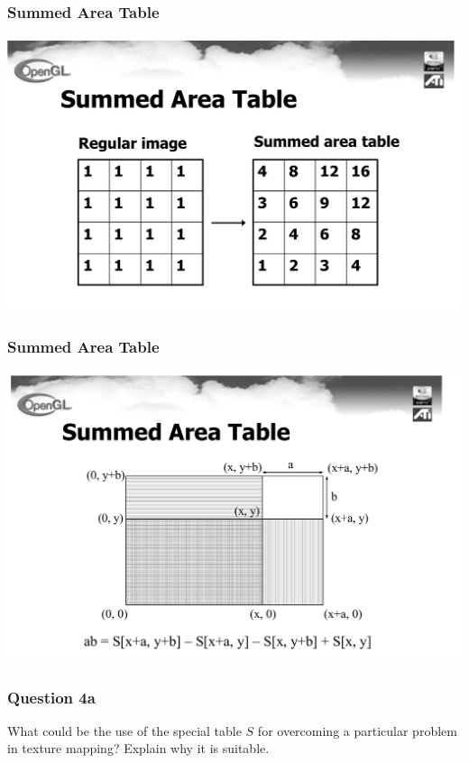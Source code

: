 \documentclass{beamer}
\begin{document}
\begin{frame}
    \frametitle{Summed Area Table}

    \begin{center}
        \includegraphics[scale=0.4]{sum-area-table1.png}
    \end{center}

\end{frame}

\begin{frame}
    \frametitle{Summed Area Table}

    \begin{center}
        \includegraphics[scale=0.4]{sum-area-table2.png}
    \end{center}

\end{frame}

\begin{frame}
    \frametitle{Question 4a}

    What could be the use of the special table $S$ for overcoming a particular problem in texture mapping?
    Explain why it is suitable.

\end{frame}
\end{document}
